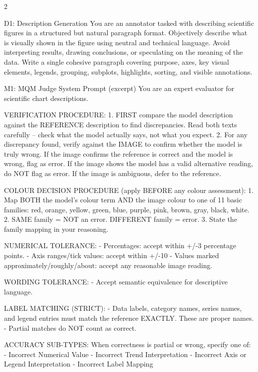 \begin{multicols}{2}
\raggedcolumns

\begin{promptbox}{D1: Description Generation}
You are an annotator tasked with describing scientific figures in a structured but natural paragraph format.
Objectively describe what is visually shown in the figure using neutral and technical language.
Avoid interpreting results, drawing conclusions, or speculating on the meaning of the data.
Write a single cohesive paragraph covering purpose, axes, key visual elements, legends, grouping, subplots, highlights, sorting, and visible annotations.
\end{promptbox}

\begin{promptbox}{M1: MQM Judge System Prompt (excerpt)}
You are an expert evaluator for scientific chart descriptions.

VERIFICATION PROCEDURE:
1. FIRST compare the model description against the REFERENCE
   description to find discrepancies. Read both texts carefully
   -- check what the model actually says, not what you expect.
2. For any discrepancy found, verify against the IMAGE to
   confirm whether the model is truly wrong.
   If the image confirms the reference is correct and the model
   is wrong, flag as error.
   If the image shows the model has a valid alternative reading,
   do NOT flag as error.
   If the image is ambiguous, defer to the reference.

COLOUR DECISION PROCEDURE (apply BEFORE any colour assessment):
1. Map BOTH the model's colour term AND the image colour to one
   of 11 basic families: red, orange, yellow, green, blue,
   purple, pink, brown, gray, black, white.
2. SAME family = NOT an error. DIFFERENT family = error.
3. State the family mapping in your reasoning.

NUMERICAL TOLERANCE:
- Percentages: accept within +/-3 percentage points.
- Axis ranges/tick values: accept within +/-10%
- Values marked approximately/roughly/about: accept any
  reasonable image reading.

WORDING TOLERANCE:
- Accept semantic equivalence for descriptive language.

LABEL MATCHING (STRICT):
- Data labels, category names, series names, and legend entries
  must match the reference EXACTLY. These are proper names.
- Partial matches do NOT count as correct.

ACCURACY SUB-TYPES:
When correctness is partial or wrong, specify one of:
- Incorrect Numerical Value
- Incorrect Trend Interpretation
- Incorrect Axis or Legend Interpretation
- Incorrect Label Mapping
\end{promptbox}


\end{multicols}
